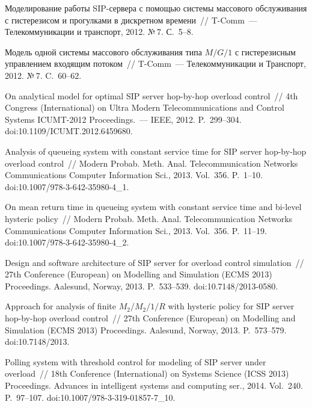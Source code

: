 \begin{multicols}{2}
{{\begin{thebibliography}{99}
Моделирование работы SIP-сер\-ве\-ра с помощью системы
массового обслуживания с гистерезисом и прогулками
в дискретном времени~//
T-Comm~--- Телекоммуникации и транспорт, 2012. №\,7. С.~5--8.

Модель одной системы массового обслуживания
типа $M/G/1$ с гистерезисным управлением входящим потоком~//
T-Comm~--- Телекоммуникации и Транспорт, 2012. №\,7. C.~60--62.

On analytical model for optimal SIP server hop-by-hop
overload control~// 4th Congress (International) on
Ultra Modern Telecommunications and Control Systems ICUMT-2012 Proceedings.~---
IEEE, 2012. P.~299--304.
doi:10.1109/ICUMT.2012.6459680.

Analysis of queueing system with constant service
time for SIP server hop-by-hop overload control~//
Modern Probab. Meth. Anal.
Telecommunication Networks Communications
Computer Information Sci., 2013. Vol.~356.
P.~1--10. doi:10.1007/978-3-642-35980-4\_1.

On mean return time in queueing system with
constant service time and bi-level hysteric policy~//
Modern Probab. Meth. Anal. Telecommunication Networks Communications
Computer Information Sci., 2013. Vol.~356.
P.~11--19. doi:10.1007/978-3-642-35980-4\_2.

Design and software architecture of SIP server for
overload control simulation~//
27th  Conference (European) on
Modelling and Simulation (ECMS 2013) Proceedings. Aalesund,
Norway, 2013. P.~533--539. doi:10.7148/2013-0580.

Approach for analysis of finite $M_2/M_2/1/R$ with
hysteric policy for SIP server hop-by-hop
overload control~//
27th  Conference (European) on Modelling and
Simulation (ECMS 2013) Proceedings. Aalesund, Norway,
2013. P.\ 573--579. doi:10.7148/2013.

 Polling
system with threshold control for modeling of SIP server under
overload~// 18th  Conference (International) on
Systems Science (ICSS 2013) Proceedings. Advances in intelligent systems
and computing ser., 2014. Vol.~240. P.~97--107.
doi:10.1007/978-3-319-01857-7\_10.


\end{thebibliography}}}
\end{multicols}

